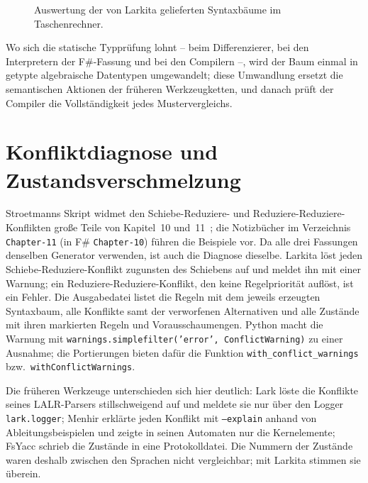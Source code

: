 \begin{figure}[htbp]
  \centering



  \caption{Auswertung der von Larkita gelieferten Syntaxbäume im Taschenrechner.}
  \label{lst:calculator_eval}
\end{figure}

Wo sich die statische Typprüfung lohnt -- beim Differenzierer, bei den Interpretern der F\#-Fassung und bei den Compilern --, wird der Baum einmal in getypte algebraische Datentypen umgewandelt; diese Umwandlung ersetzt die semantischen Aktionen der früheren Werkzeugketten, und danach prüft der Compiler die Vollständigkeit jedes Mustervergleichs.

\section{Konfliktdiagnose und Zustandsverschmelzung}
\label{sec:conflict_diagnostics}

Stroetmanns Skript widmet den Schiebe-Reduziere- und Reduziere-Reduziere-Konflikten große Teile von Kapitel~10 und~11~\cite{stroetmann2026formal}; die Notizbücher im Verzeichnis \texttt{Chapter-11} (in F\# \texttt{Chapter-10}) führen die Beispiele vor.
Da alle drei Fassungen denselben Generator verwenden, ist auch die Diagnose dieselbe.
Larkita löst jeden Schiebe-Reduziere-Konflikt zugunsten des Schiebens auf und meldet ihn mit einer Warnung; ein Reduziere-Reduziere-Konflikt, den keine Regelpriorität auflöst, ist ein Fehler.
Die Ausgabedatei listet die Regeln mit dem jeweils erzeugten Syntaxbaum, alle Konflikte samt der verworfenen Alternativen und alle Zustände mit ihren markierten Regeln und Vorausschaumengen.
Python macht die Warnung mit \texttt{warnings.simplefilter('error', ConflictWarning)} zu einer Ausnahme; die Portierungen bieten dafür die Funktion \texttt{with\_conflict\_warnings} bzw.\ \texttt{withConflictWarnings}.

Die früheren Werkzeuge unterschieden sich hier deutlich:
Lark löste die Konflikte seines LALR-Parsers stillschweigend auf und meldete sie nur über den Logger \texttt{lark.logger}; Menhir erklärte jeden Konflikt mit \texttt{--explain} anhand von Ableitungsbeispielen und zeigte in seinen Automaten nur die Kernelemente; FsYacc schrieb die Zustände in eine Protokolldatei.
Die Nummern der Zustände waren deshalb zwischen den Sprachen nicht vergleichbar; mit Larkita stimmen sie überein.

